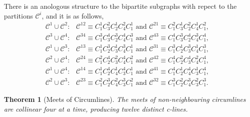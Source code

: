 \documentclass{unswthesis}
\newtheorem{theorem}{Theorem}
\begin{document}
There is an anologous structure to the bipartite subgraphs with repect to
the partitions $\mathcal{C}^{i}$, and it is as follows,%
\begin{equation*}
\begin{array}{cc}
\mathcal{C}^{1}\cup \mathcal{C}^{2}: & \mathcal{C}^{12}\equiv
C_{1}^{1}C_{3}^{2}C_{2}^{1}C_{4}^{2}C_{1}^{1}\text{ and }\mathcal{C}%
^{21}\equiv C_{1}^{2}C_{3}^{1}C_{2}^{2}C_{4}^{1}C_{1}^{2}, \\ 
\mathcal{C}^{3}\cup \mathcal{C}^{4}: & \mathcal{C}^{34}\equiv
C_{1}^{3}C_{3}^{4}C_{2}^{3}C_{4}^{4}C_{1}^{3}\text{ and }\mathcal{C}%
^{43}\equiv C_{1}^{4}C_{3}^{3}C_{2}^{4}C_{4}^{3}C_{1}^{4}, \\ 
\mathcal{C}^{1}\cup \mathcal{C}^{3}: & \mathcal{C}^{13}\equiv
C_{1}^{1}C_{2}^{3}C_{3}^{1}C_{4}^{3}C_{1}^{1}\text{ and }\mathcal{C}%
^{31}\equiv C_{1}^{3}C_{2}^{1}C_{3}^{3}C_{4}^{1}C_{1}^{3}, \\ 
\mathcal{C}^{2}\cup \mathcal{C}^{4}: & \mathcal{C}^{24}\equiv
C_{1}^{2}C_{2}^{4}C_{3}^{2}C_{4}^{4}C_{1}^{2}\text{ and }\mathcal{C}%
^{42}\equiv C_{1}^{4}C_{2}^{2}C_{3}^{4}C_{4}^{2}C_{1}^{4}, \\ 
\mathcal{C}^{1}\cup \mathcal{C}^{4}: & \mathcal{C}^{14}\equiv
C_{1}^{1}C_{2}^{4}C_{4}^{1}C_{3}^{4}C_{1}^{1}\text{ and }\mathcal{C}%
^{41}\equiv C_{1}^{4}C_{2}^{1}C_{4}^{4}C_{3}^{1}C_{1}^{4}, \\ 
\mathcal{C}^{2}\cup \mathcal{C}^{3}: & \mathcal{C}^{23}\equiv
C_{1}^{2}C_{2}^{3}C_{4}^{2}C_{3}^{3}C_{1}^{2}\text{ and }\mathcal{C}%
^{32}\equiv C_{1}^{3}C_{2}^{2}C_{4}^{3}C_{3}^{2}C_{1}^{3}.%
\end{array}%
\end{equation*}

\begin{theorem}[Meets of Circumlines]
The meets of non-neighbouring circumlines are collinear four at a time,
producing twelve distinct c-lines.
\end{theorem}
\end{document}
